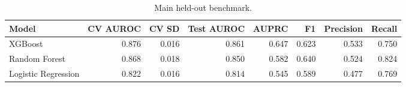 \begin{table}[htbp]
\centering
\caption{Main held-out benchmark.}
\label{tab:main_benchmark_recomputed}
\begin{tabular}{lrrrrrrr}
\toprule
Model & CV AUROC & CV SD & Test AUROC & AUPRC & F1 & Precision & Recall \\
\midrule
XGBoost & 0.876 & 0.016 & 0.861 & 0.647 & 0.623 & 0.533 & 0.750 \\
Random Forest & 0.868 & 0.018 & 0.850 & 0.582 & 0.640 & 0.524 & 0.824 \\
Logistic Regression & 0.822 & 0.016 & 0.814 & 0.545 & 0.589 & 0.477 & 0.769 \\
\bottomrule
\end{tabular}

\end{table}
